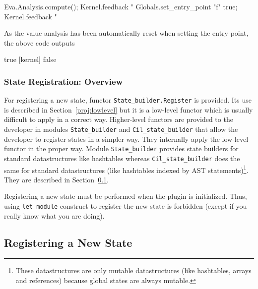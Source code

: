 \begin{itemize}
\begin{example}
\begin{ocamlcode}
Eva.Analysis.compute();
Kernel.feedback "%
Globals.set_entry_point "f" true;
Kernel.feedback "%
\end{ocamlcode}
As the value analysis has been automatically reset when setting the entry point,
the above code outputs
\begin{shell}
[kernel] true
[kernel] false
\end{shell}
\end{example}
\end{itemize}

\subsubsection{State Registration: Overview}

For registering a new state, functor
\texttt{State\_builder.Register} is
provided. Its use is described in Section~\ref{proj:lowlevel} but it is a
low-level functor which is usually difficult to apply in a correct
way. Higher-level functors are provided to the developer in modules
\texttt{State\_builder} and
\texttt{Cil\_state\_builder} that allow the
developer to register states in a simpler way. They internally apply the
low-level functor in the proper way. Module \texttt{State\_builder} provides
state builders for standard \caml datastructures like
hashtables whereas \texttt{Cil\_state\_builder} does the same
for standard \cil datastructures (like hashtables indexed by AST
statements)\footnote{These datastructures are only mutable datastructures (like
  hashtables, arrays and references) because global states are always
  mutable.}. They are described in Section~\ref{proj:computation}.

\begin{important}
  Registering a new state must be performed when the plugin is
  initialized. Thus, using \caml \texttt{let module} construct to
  register the new state is forbidden (except if you really know what
  you are doing).
\end{important}

\subsection{Registering a New State}\label{proj:computation}

